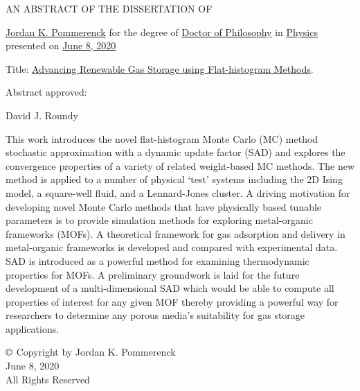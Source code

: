 \thispagestyle{empty}
\begin{center}
	\large
	AN ABSTRACT OF THE DISSERTATION OF
\end{center}


\justify{}
\underline{Jordan K. Pommerenck} for the degree of \underline{Doctor of Philosophy} in \underline{Physics}
\nobreak presented on \underline{June 8, 2020}
\vspace{1.0cm}

\justify{}
Title: \underline{Advancing Renewable Gas Storage using Flat-histogram Methods}.
\vspace{2.0cm}

\justify{}
Abstract approved:
\underline{\hspace{11cm}}
\vspace{0.1cm}

\hspace{7.0cm} David J. Roundy
\vspace{1.0cm}

\justify{}
\doublespacing
This work introduces the novel flat-histogram Monte
Carlo (MC) method stochastic approximation with a dynamic update factor (SAD) and explores the convergence properties of a
variety of related weight-based MC methods. The new method is applied
to a number of physical `test’ systems including the 2D Ising model, a
square-well fluid, and a Lennard-Jones cluster. A driving motivation for
developing novel Monte Carlo methods that have physically based tunable
parameters is to provide simulation methods for exploring metal-organic
frameworks (MOFs). A theoretical framework for gas adsorption and
delivery in metal-organic frameworks is developed and compared with
experimental data. SAD is introduced as a powerful method for examining
thermodynamic properties for MOFs. A preliminary groundwork is laid for
the future development of a multi-dimensional SAD which would be able
to compute all properties of interest for any given MOF thereby providing a powerful way for researchers to determine any porous media's suitability for gas storage applications.

\newpage{}
\thispagestyle{empty}
\singlespacing

\vspace*{4.0cm}
\begin{center}
$\copyright$ Copyright by Jordan K. Pommerenck \\
June 8, 2020 \\
All Rights Reserved
\end{center}

